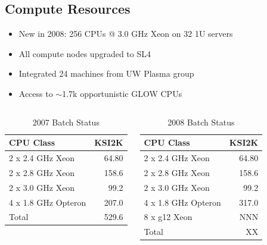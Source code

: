 \documentclass{beamer}
\newcommand{\ca}{\ensuremath{\sim}}
\begin{document}
\subsection{Compute Resources}
\begin{frame}
\begin{itemize}
    \item New in 2008: 256 CPUs @ 3.0 GHz Xeon on 32 1U servers
    \item All compute nodes upgraded to SL4
    \item Integrated 24 machines from UW Plasma group
    \item Access to \ca{}1.7k opportunistic GLOW CPUs
\end{itemize}
\begin{columns}
\column{2.5in}
\begin{table}
    \begin{tabular}{lr}
        \toprule
        CPU Class           & KSI2K \\
        \midrule
        2 x 2.4 GHz Xeon    & 64.80 \\    %
        2 x 2.8 GHz Xeon    & 158.6 \\    %
        2 x 3.0 GHz Xeon    & 99.2 \\     %
        4 x 1.8 GHz Opteron & 207.0 \\    %
        \midrule
        Total & 529.6 \\
        \bottomrule
    \end{tabular}
    \caption{2007 Batch Status}
    \label{2007_Batch_status}
\end{table}

\column{2.5in}
\begin{table}
    \begin{tabular}{lr}
        \toprule
        CPU Class           & KSI2K \\
        \midrule
        2 x 2.4 GHz Xeon    & 64.80 \\    %
        2 x 2.8 GHz Xeon    & 158.6 \\    %
        2 x 3.0 GHz Xeon    & 99.2 \\     %
        4 x 1.8 GHz Opteron & 317.0 \\    %
        8 x g12 Xeon & NNN \\             %
        \midrule
        Total & XX \\
        \bottomrule
    \end{tabular}
    \caption{2008 Batch Status}
    \label{2008_Batch_status}
\end{table}
\end{columns}
\end{frame}
\end{document}
